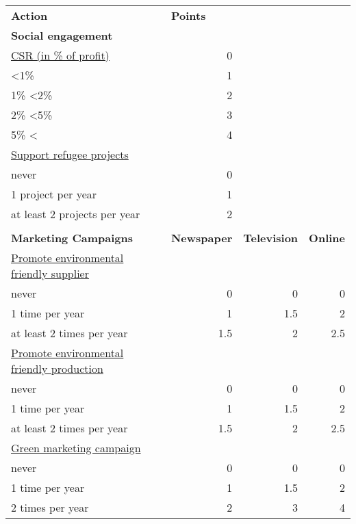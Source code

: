 \begin{table}[]
\begin{tabular}{|l|r|r|r|}
\hline
\multicolumn{1}{|l|}{\textbf{Action}}             & \multicolumn{1}{l|}{\textbf{Points}} & \multicolumn{1}{l|}{}       & \multicolumn{1}{l|}{}   \\
\textbf{Social engagement}        &       &       &  \\
\underline{CSR (in \% of profit)} & 0     &       &  \\
\textless 1\%                     & 1     &       &  \\
1\% \textless 2\%                 & 2     &       &  \\
2\% \textless 5\%                 & 3     &       &  \\
5\% \textless{}                   & 4     &       &  \\
\underline{Support refugee projects}  &   &       &  \\
never                             & 0     &       &  \\
1 project per year                & 1     &       &  \\
at least 2 projects per year      & 2     &       &  \\
&  &  &  \\
\textbf{Marketing Campaigns}  & \textbf{Newspaper} & \textbf{Television} & \textbf{Online} \\
\underline{Promote environmental friendly supplier}   & & & \\
never                             & 0    & 0      & 0 \\
1 time per year                   & 1    & 1.5    & 2 \\
at least 2 times per year         & 1.5  & 2      & 2.5 \\
\underline{Promote environmental friendly production} & & & \\
never                             & 0    & 0      & 0 \\
1 time per year                   & 1    & 1.5    & 2 \\
at least 2 times per year         & 1.5  & 2      & 2.5 \\
\underline{Green marketing campaign} & & & \\
never                             & 0    & 0      & 0 \\
1 time per year                   & 1    & 1.5    & 2 \\
2 times per year                  & 2    & 3      & 4 \\

\end{tabular}
\end{table}
